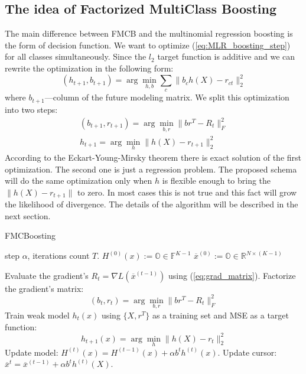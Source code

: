 \documentclass{article}
\begin{document}
\subsection{The idea of Factorized MultiClass Boosting}
The main difference between FMCB and the multinomial regression boosting is the form of decision function. We want to optimize (\ref{eq:MLR_boosting_step}) for all classes simultaneously. Since the $l_2$ target function is additive and we can rewrite the optimization in the following form:
\begin{equation}
(h_{t+1},b_{t+1}) = \arg \min_{h,b} \sum_c \|b_ch(X) - r_{ct}\|_2^2
\end{equation}
where $b_{t+1}$---column of the future modeling matrix. We split this optimization into two steps:
\begin{equation}\begin{array}{l}
(b_{t+1},r_{t+1}) = \arg \min_{b,r} \|b r^T - R_t\|_F^2 \\
h_{t+1}	= \arg \min_{h} \|h(X) - r_{t+1}\|_2^2
\end{array}\end{equation}
According to the Eckart-Young-Mirsky theorem \cite{Eckart1936} there is exact solution of the first optimization. The second one is just a regression problem. The proposed schema will do the same optimization only when $h$ is flexible enough to bring the $\|h(X) - r_{t+1}\|$ to zero. In most cases this is not true and this fact will grow the likelihood of divergence. The details of the algorithm will be described in the next section.
\label{sec:fmcb_idea}


\begin{algorithm}[tb]
\caption{FMCBoosting}
\label{alg:boost_fmcb}
\begin{algorithmic}
 step $\alpha$, iterations count $T$.
\STATE $H^{(0)}(x):= \mathbb{O} \in \mathbb{F}^{K-1}$ 
\STATE $\overline{x}^{(0)} := \mathbb{O} \in \mathbb{R}^{N \times (K-1)}$ 
 
 	\STATE Evaluate the gradient's $R_t=\nabla L(\overline{x}^{(t-1)})$ using (\ref{eq:grad_matrix}).
	\STATE Factorize the gradient's matrix:
			$$(b_{t},r_{t}) = \arg\min_{b,r} \|b r^T - R_t\|_F^2$$
	\STATE Train weak model $h_{t}(x)$ using $\{X,r^T\}$ as a training set and MSE as a target function:
 			$$h_{t+1}(x) = \arg\min_{h} \|h(X) - r_{t}\|_2^2$$  	
	\STATE Update model: $H^{(t)}(x) = H^{(t-1)}(x) + \alpha b^t h^{(t)}(x)$.
	\STATE Update cursor: $\overline{x}^{t} = \overline{x}^{(t-1)} + \alpha b^t h^{(t)}(X)$.
\ENDFOR    
\end{algorithmic}
\end{algorithm}
\end{document}
